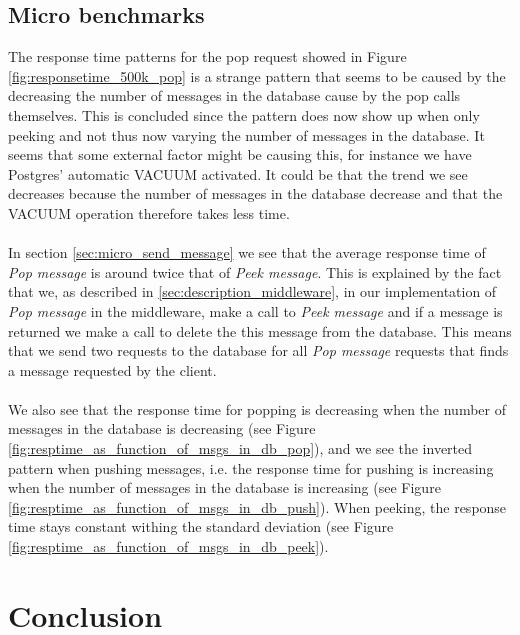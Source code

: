 \documentclass{article}
\begin{document}
        \subsection{Micro benchmarks}
            \label{sec:analysis_micro_benchmarks}
            The response time patterns for the pop request showed in Figure \ref{fig:responsetime_500k_pop} is a strange pattern that seems to be caused by the decreasing the number of messages in the database cause by the pop calls themselves. This is concluded since the pattern does now show up when only peeking and not thus now varying the number of messages in the database. It seems that some external factor might be causing this, for instance we have Postgres' automatic VACUUM activated. It could be that the trend we see decreases because the number of messages in the database decrease and that the VACUUM operation therefore takes less time.\\
            \\
            In section \ref{sec:micro_send_message} we see that the average response time of \textit{Pop message} is around twice that of \textit{Peek message}. This is explained by the fact that we, as described in \ref{sec:description_middleware}, in our implementation of \textit{Pop message} in the middleware, make a call to \textit{Peek message} and if a message is returned we make a call to delete the this message from the database. This means that we send two requests to the database for all \textit{Pop message} requests that finds a message requested by the client.\\
            \\
            We also see that the response time for popping is decreasing when the number of messages in the database is decreasing (see Figure \ref{fig:resptime_as_function_of_msgs_in_db_pop}), and we see the inverted pattern when pushing messages, i.e. the response time for pushing is increasing when the number of messages in the database is increasing (see Figure \ref{fig:resptime_as_function_of_msgs_in_db_push}). When peeking, the response time stays constant withing the standard deviation (see Figure \ref{fig:resptime_as_function_of_msgs_in_db_peek}).

    \section{Conclusion}
\end{document}

